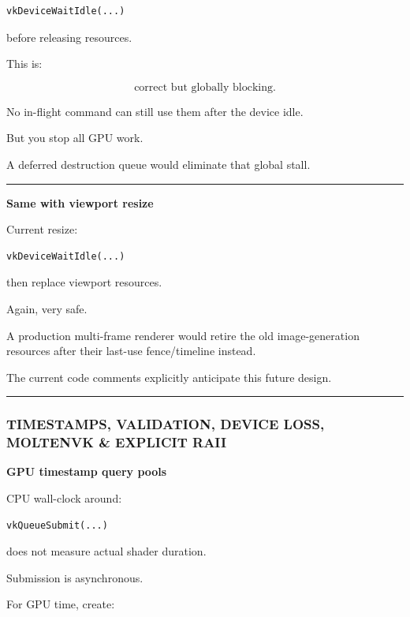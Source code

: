 \begin{verbatim}
vkDeviceWaitIdle(...)
\end{verbatim}

before releasing resources.

This is:

\[
\boxed{\text{correct but globally blocking}.}
\]

No in-flight command can still use them after the device idle.

But you stop all GPU work.

A deferred destruction queue would eliminate that global stall.

\begin{center}\rule{0.5\linewidth}{0.5pt}\end{center}

\textbf{Same with viewport resize}

Current resize:

\begin{verbatim}
vkDeviceWaitIdle(...)
\end{verbatim}

then replace viewport resources.

Again, very safe.

A production multi-frame renderer would retire the old image-generation resources after their last-use fence/timeline instead.

The current code comments explicitly anticipate this future design.

\begin{center}\rule{0.5\linewidth}{0.5pt}\end{center}

\subsubsection{TIMESTAMPS, VALIDATION, DEVICE LOSS, MOLTENVK \& EXPLICIT RAII}\label{timestamps-validation-device-loss-moltenvk-explicit-raii}

\textbf{GPU timestamp query pools}

CPU wall-clock around:

\begin{verbatim}
vkQueueSubmit(...)
\end{verbatim}

does not measure actual shader duration.

Submission is asynchronous.

For GPU time, create:

